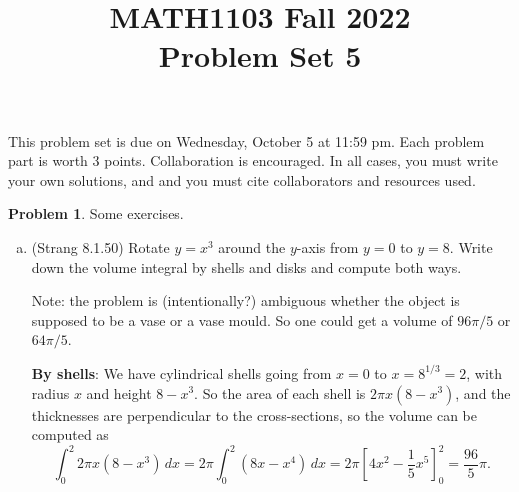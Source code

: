 \documentclass[11pt,oneside]{amsart}
\title{MATH1103 Fall 2022\\
Problem Set 5}
\theoremstyle{definition}
\newtheorem{problem}{Problem}
\begin{document}
    \maketitle
    This problem set is due on Wednesday, October 5 at 11:59 pm. Each problem part is worth 3 points. Collaboration is encouraged. In all cases, you must write your own solutions, and and you must cite collaborators and resources used.

    \begin{problem}
        Some exercises.
        \begin{enumerate}[(a)]
            \item (Strang 8.1.50) Rotate $y=x^3$ around the $y$-axis from $y=0$ to $y=8$. Write down the volume integral by shells and disks and compute both ways.
            \begin{solution}
                Note: the problem is (intentionally?) ambiguous whether the object is supposed to be a vase or a vase mould. So one could get a volume of $96\pi/5$ or $64\pi/5$.

                \textbf{By shells}: We have cylindrical shells going from $x=0$ to $x=8^{1/3}=2$, with radius $x$ and height $8-x^3$. So the area of each shell is $2\pi x(8-x^3)$, and the thicknesses are perpendicular to the cross-sections, so the volume can be computed as
                \[\int_0^2 2\pi x(8-x^3)\,dx=2\pi \int_0^2 (8x-x^4)\,dx=2\pi\left[4x^2-\frac 15 x^5\right]_0^2=\frac{96}5\pi.\]


\end{solution}
\end{enumerate}
\end{problem}
\end{document}
